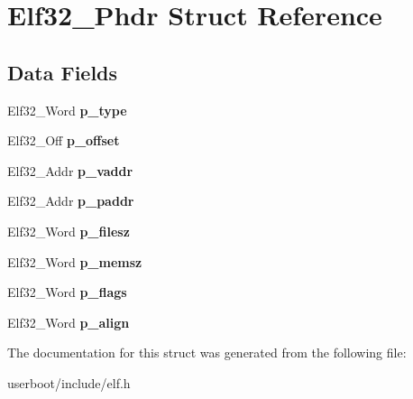 \hypertarget{structElf32__Phdr}{}\section{Elf32\+\_\+\+Phdr Struct Reference}
\label{structElf32__Phdr}
\subsection*{Data Fields}
\begin{DoxyCompactItemize}
\item 
Elf32\+\_\+\+Word {\bfseries p\+\_\+type}\hypertarget{structElf32__Phdr_a8b1d2942ddb9abcb85db1429b5116923}{}\label{structElf32__Phdr_a8b1d2942ddb9abcb85db1429b5116923}

\item 
Elf32\+\_\+\+Off {\bfseries p\+\_\+offset}\hypertarget{structElf32__Phdr_ac590d4c4b26104216e53058b5b03eef0}{}\label{structElf32__Phdr_ac590d4c4b26104216e53058b5b03eef0}

\item 
Elf32\+\_\+\+Addr {\bfseries p\+\_\+vaddr}\hypertarget{structElf32__Phdr_a01a298ebc899bcf9c23211a7bf1155a6}{}\label{structElf32__Phdr_a01a298ebc899bcf9c23211a7bf1155a6}

\item 
Elf32\+\_\+\+Addr {\bfseries p\+\_\+paddr}\hypertarget{structElf32__Phdr_af18f0a179a5fca09e3c04bcdce3fac2f}{}\label{structElf32__Phdr_af18f0a179a5fca09e3c04bcdce3fac2f}

\item 
Elf32\+\_\+\+Word {\bfseries p\+\_\+filesz}\hypertarget{structElf32__Phdr_ac9151f2e11001284bf1c7d2d2659555c}{}\label{structElf32__Phdr_ac9151f2e11001284bf1c7d2d2659555c}

\item 
Elf32\+\_\+\+Word {\bfseries p\+\_\+memsz}\hypertarget{structElf32__Phdr_ada1cdd3d6ccb79a17bed0e3c21379c84}{}\label{structElf32__Phdr_ada1cdd3d6ccb79a17bed0e3c21379c84}

\item 
Elf32\+\_\+\+Word {\bfseries p\+\_\+flags}\hypertarget{structElf32__Phdr_a35c457e6828894b7b275730593802050}{}\label{structElf32__Phdr_a35c457e6828894b7b275730593802050}

\item 
Elf32\+\_\+\+Word {\bfseries p\+\_\+align}\hypertarget{structElf32__Phdr_afd09d9e4297b13fc94fd57d09f2a9f70}{}\label{structElf32__Phdr_afd09d9e4297b13fc94fd57d09f2a9f70}

\end{DoxyCompactItemize}


The documentation for this struct was generated from the following file\+:\begin{DoxyCompactItemize}
\item 
userboot/include/elf.\+h\end{DoxyCompactItemize}
